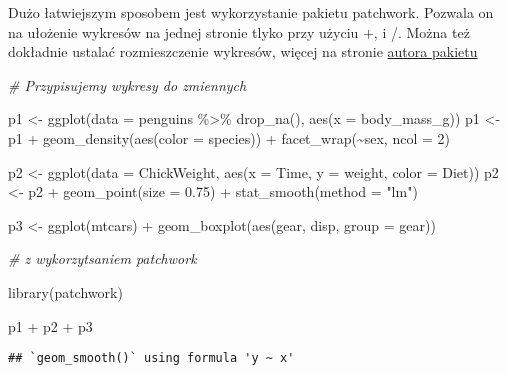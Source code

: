 \documentclass[
]{book}
\newenvironment{Shaded}{\begin{snugshade}}{\end{snugshade}}
\newcommand{\AttributeTok}[1]{\textcolor[rgb]{0.77,0.63,0.00}{#1}}
\newcommand{\CommentTok}[1]{\textcolor[rgb]{0.56,0.35,0.01}{\textit{#1}}}
\newcommand{\DecValTok}[1]{\textcolor[rgb]{0.00,0.00,0.81}{#1}}
\newcommand{\FloatTok}[1]{\textcolor[rgb]{0.00,0.00,0.81}{#1}}
\newcommand{\FunctionTok}[1]{\textcolor[rgb]{0.00,0.00,0.00}{#1}}
\newcommand{\NormalTok}[1]{#1}
\newcommand{\OtherTok}[1]{\textcolor[rgb]{0.56,0.35,0.01}{#1}}
\newcommand{\SpecialCharTok}[1]{\textcolor[rgb]{0.00,0.00,0.00}{#1}}
\newcommand{\StringTok}[1]{\textcolor[rgb]{0.31,0.60,0.02}{#1}}
\begin{document}
Dużo łatwiejszym sposobem jest wykorzystanie pakietu patchwork. Pozwala on na ułożenie wykresów na jednej stronie tlyko przy użyciu +, \textbar{} i /. Można też dokładnie ustalać rozmieszczenie wykresów, więcej na stronie \href{https://patchwork.data-imaginist.com/index.html}{autora pakietu}

\begin{Shaded}
\begin{Highlighting}[]
\CommentTok{\# Przypisujemy wykresy do zmiennych}

\NormalTok{p1 }\OtherTok{\textless{}{-}} \FunctionTok{ggplot}\NormalTok{(}\AttributeTok{data =}\NormalTok{ penguins }\SpecialCharTok{\%\textgreater{}\%} \FunctionTok{drop\_na}\NormalTok{(), }\FunctionTok{aes}\NormalTok{(}\AttributeTok{x =}\NormalTok{ body\_mass\_g))}
\NormalTok{p1 }\OtherTok{\textless{}{-}}\NormalTok{ p1 }\SpecialCharTok{+} \FunctionTok{geom\_density}\NormalTok{(}\FunctionTok{aes}\NormalTok{(}\AttributeTok{color =}\NormalTok{ species)) }\SpecialCharTok{+} \FunctionTok{facet\_wrap}\NormalTok{(}\SpecialCharTok{\textasciitilde{}}\NormalTok{sex, }\AttributeTok{ncol =} \DecValTok{2}\NormalTok{)}

\NormalTok{p2 }\OtherTok{\textless{}{-}} \FunctionTok{ggplot}\NormalTok{(}\AttributeTok{data =}\NormalTok{ ChickWeight, }\FunctionTok{aes}\NormalTok{(}\AttributeTok{x =}\NormalTok{ Time, }\AttributeTok{y =}\NormalTok{ weight, }\AttributeTok{color =}\NormalTok{ Diet))}
\NormalTok{p2 }\OtherTok{\textless{}{-}}\NormalTok{ p2 }\SpecialCharTok{+} \FunctionTok{geom\_point}\NormalTok{(}\AttributeTok{size =} \FloatTok{0.75}\NormalTok{) }\SpecialCharTok{+} \FunctionTok{stat\_smooth}\NormalTok{(}\AttributeTok{method =} \StringTok{"lm"}\NormalTok{)}

\NormalTok{p3 }\OtherTok{\textless{}{-}} \FunctionTok{ggplot}\NormalTok{(mtcars) }\SpecialCharTok{+} \FunctionTok{geom\_boxplot}\NormalTok{(}\FunctionTok{aes}\NormalTok{(gear, disp, }\AttributeTok{group =}\NormalTok{ gear))}

\CommentTok{\# z wykorzytsaniem patchwork}

\FunctionTok{library}\NormalTok{(patchwork)}

\NormalTok{p1 }\SpecialCharTok{+}\NormalTok{ p2 }\SpecialCharTok{+}\NormalTok{ p3}
\end{Highlighting}
\end{Shaded}

\begin{verbatim}
## `geom_smooth()` using formula 'y ~ x'
\end{verbatim}
\end{document}
